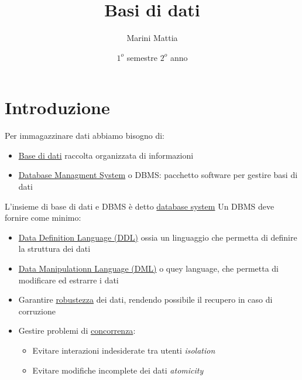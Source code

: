 \endofdump

\usetikzlibrary {er}
\usetikzlibrary{external}
\usetikzlibrary{patterns}
\tikzexternalize[prefix=tikz/]

\title{Basi di dati}
\author{Marini Mattia}
\date{$ 1^o $ semestre $ 2^o $ anno}


\maketitle
\tableofcontents
\newpage

\section{Introduzione}
Per immagazzinare dati abbiamo bisogno di:
\begin{itemize}
	\item \underline{Base di dati} raccolta organizzata  di informazioni
	\item \underline{Database Managment System} o DBMS: pacchetto software per gestire basi di dati
\end{itemize}
L'insieme di base di dati e DBMS è detto \underline{database system}
\vskip3mm
Un DBMS deve fornire come minimo:
\begin{itemize}
	\item \underline{Data Definition Language (DDL)} ossia un linguaggio che permetta di definire la struttura dei dati
	\item \underline{Data Manipulationn Language (DML)} o quey language, che permetta di modificare ed estrarre i dati
	\item Garantire \underline{robustezza} dei dati, rendendo possibile il recupero in caso di corruzione
	\item Gestire problemi di \underline{concorrenza}:
	      \begin{itemize}
		      \item Evitare interazioni indesiderate tra utenti \textit{isolation}
		      \item Evitare modifiche incomplete dei dati \textit{atomicity}
	      \end{itemize}
\end{itemize}
